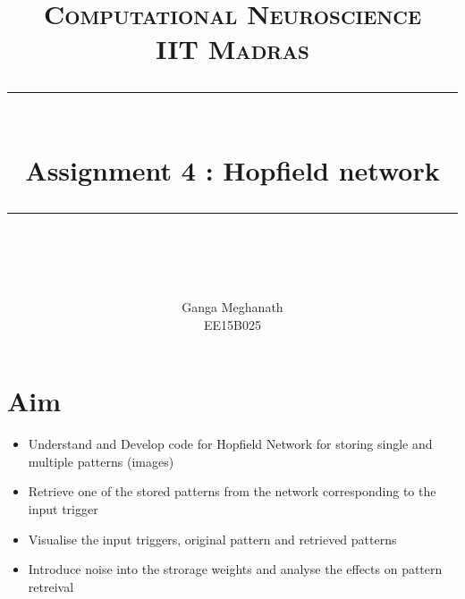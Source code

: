 \documentclass{article} %
\title{
\normalfont \normalsize 
\textsc{Computational Neuroscience \\ 
IIT Madras} \\
[10pt] 
\rule{\linewidth}{0.5pt} \\[6pt] 
\huge Assignment 4 : Hopfield network \\
\rule{\linewidth}{2pt}  \\[10pt]
}
\author{Ganga Meghanath \\
EE15B025}
\begin{document}
\maketitle



%
%
%
%





\section{Aim}

\begin{itemize}
    \item Understand and Develop code for Hopfield Network for storing single and multiple patterns (images)
    \item Retrieve one of the stored patterns from the network corresponding to the input trigger
    \item Visualise the input triggers, original pattern and retrieved patterns
    \item Introduce noise into the strorage weights and analyse the effects on pattern retreival
\end{itemize}
\end{document}
